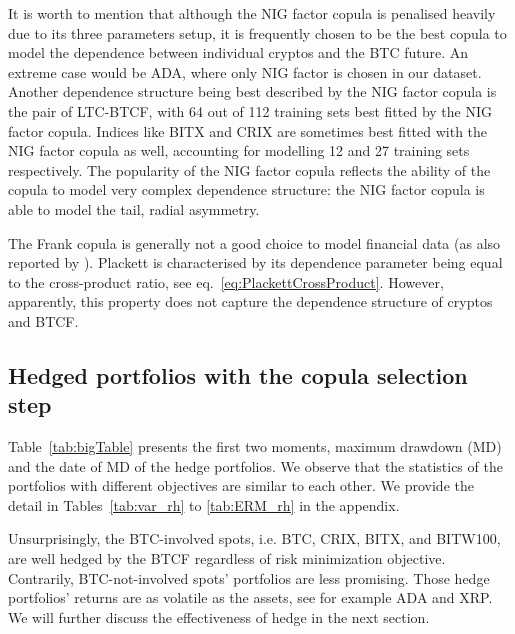 It is worth to mention that although the NIG factor copula is penalised heavily due to its three parameters setup,
it is frequently chosen to be the best copula to model the dependence
between individual cryptos and the BTC future.
An extreme case would be ADA, where only NIG factor is chosen in our dataset.
Another dependence structure being best described by the NIG factor
copula is the pair of LTC-BTCF, with
64 out of 112 training sets best fitted by the NIG factor copula.
Indices like BITX and CRIX are sometimes best fitted with the NIG
factor copula as well, accounting for modelling 12 and 27 training
sets respectively.
The popularity of the NIG factor copula reflects the ability of the copula to
model very complex dependence structure: the
NIG factor copula is able to model the tail, radial asymmetry.


The Frank copula is generally not a good choice to model financial
data (as also reported by \cite{barbi2014copula}).
Plackett is characterised by its dependence parameter being equal to
the cross-product ratio, see eq.~\ref{eq:PlackettCrossProduct}.
However, apparently, this property does not capture the dependence
structure of cryptos and BTCF.

\subsection{Hedged portfolios with the copula selection step}\label{subsec:HP2}

\begin{landscape}
  
  \end{landscape}
Table~\ref{tab:bigTable} presents the first two moments, maximum drawdown (MD) and the date of MD of the hedge portfolios.
We observe that the statistics of the portfolios with different objectives are similar to each other.
We provide the detail in Tables~\ref{tab:var_rh} to \ref{tab:ERM_rh} in the appendix.

Unsurprisingly, the BTC-involved spots, i.e. BTC, CRIX, BITX, and BITW100, are well hedged by the BTCF regardless of risk minimization objective.
Contrarily, BTC-not-involved spots' portfolios are less promising.
Those hedge portfolios' returns are as volatile as the assets, see for example ADA and XRP.
We will further discuss the effectiveness of hedge in the next section. %

